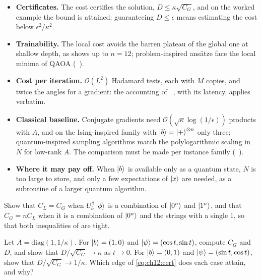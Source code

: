 \documentclass[handoutsbeamer.tex]{subfiles}
\begin{document}
\begin{frame}
\onp{\footnotesize}
\begin{itemize}\setlength\itemsep{0.3em}
    \item \textbf{Certificates.} The cost certifies the solution, $D\le\kappa\sqrt{C_G}$, and on the worked example the bound is attained: guaranteeing $D\le\epsilon$ means estimating the cost below $\epsilon^2/\kappa^2$.
    \item \textbf{Trainability.} The local cost avoids the barren plateau of the global one at shallow depth, as  shows up to $n = 12$; problem-inspired ans\"atze face the local minima of QAOA (\Chap~).
    \item \textbf{Cost per iteration.} $\mathcal O(L^2)$ Hadamard tests, each with $M$ copies, and twice the angles for a gradient: the accounting of \Chap~, with its latency, applies verbatim.
    \item \textbf{Classical baseline.} Conjugate gradients need $\mathcal O(\sqrt\kappa\log(1/\epsilon))$ products with $A$, and on the Ising-inspired family with $\ket b = \ket+^{\otimes n}$ only three; quantum-inspired sampling algorithms match the polylogarithmic scaling in $N$ for low-rank $A$. The comparison must be made per instance family (\Chap~).
    \item \textbf{Where it may pay off.} When $\ket b$ is available only as a quantum state, $N$ is too large to store, and only a few expectations of $\ket x$ are needed, as a subroutine of a larger quantum algorithm.
\end{itemize}
\end{frame}


\begin{frame}
\onp{\footnotesize}
\begin{exe}\label{exe:ch12:costs}
Show that $C_L = C_G$ when $U_b^\dagger\ket\phi$ is a combination of $\ket{0^n}$ and $\ket{1^n}$, and that $C_G = nC_L$ when it is a combination of $\ket{0^n}$ and the strings with a single $1$, so that both inequalities of  are tight.
\end{exe}
\begin{exe}\label{exe:ch12:edges}
Let $A = \mathrm{diag}(1,1/\kappa)$. For $\ket b = (1,0)$ and $\ket\psi = (\cos t,\sin t)$, compute $C_G$ and $D$, and show that $D/\sqrt{C_G}\to\kappa$ as $t\to0$. For $\ket b = (0,1)$ and $\ket\psi = (\sin t,\cos t)$, show that $D/\sqrt{C_G}\to1/\kappa$. Which edge of \eqref{eq:ch12:cert} does each case attain, and why?
\end{exe}
\end{frame}
\end{document}
